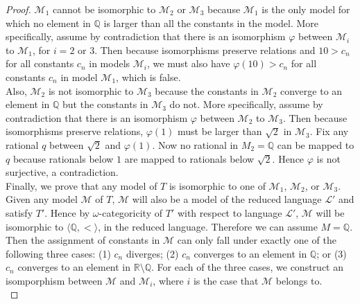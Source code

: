 \documentclass{article}
\begin{document}
\begin{enumerate}[label={\bf Q\arabic*:}]
\begin{enumerate}
\begin{proof}
          $\mathcal{M}_1$ cannot be isomorphic to $\mathcal{M}_2$ or
          $\mathcal{M}_3$ because $\mathcal{M}_1$ is the only model for
          which no element in $\mathbb{Q}$ is larger than all the constants
          in the model. More specifically, assume by contradiction that
          there is an isomorphism $\varphi$ between $\mathcal{M}_i$ to
          $\mathcal{M}_1$, for $i=2$ or $3$. Then because isomorphisms
          preserve relations and $10>c_n$ for all constants $c_n$ in models
          $\mathcal{M}_i$, we must also have $\varphi(10)>c_n$ for all
          constants $c_n$ in model $\mathcal{M}_1$, which is false. \\

          Also, $\mathcal{M}_2$ is not isomorphic to $\mathcal{M}_3$
          because the constants in $\mathcal{M}_2$ converge to an element
          in $\mathbb{Q}$ but the constants in $\mathcal{M}_3$ do not.
          More specifically, assume by contradiction that there is an
          isomorphism $\varphi$ between $\mathcal{M}_2$ to $\mathcal{M}_3$.
          Then because isomorphisms preserve relations, $\varphi(1)$ must
          be larger than $\sqrt{2}$ in $\mathcal{M}_3$. Fix any rational
          $q$ between $\sqrt{2}$ and $\varphi(1)$. Now no rational in
          $M_2=\mathbb{Q}$ can be mapped to $q$ because rationals below $1$
          are mapped to rationals below $\sqrt{2}$. Hence $\varphi$ is not
          surjective, a contradiction. \\

          Finally, we prove that any model of $T$ is isomorphic to one of
          $\mathcal{M}_1$, $\mathcal{M}_2$, or $\mathcal{M}_3$. Given any
          model $\mathcal{M}$ of $T$, $\mathcal{M}$ will also be a model of
          the reduced language $\mathcal{L}'$ and satisfy $T'$. Hence by
          $\omega$-categoricity of $T'$ with respect to language
          $\mathcal{L}'$, $\mathcal{M}$ will be isomorphic to
          $\langle\mathbb{Q},<\rangle$, in the reduced language. Therefore
          we can assume $M=\mathbb{Q}$. Then the assignment of constants in
          $\mathcal{M}$ can only fall under exactly one of the following
          three cases: (1) $c_n$ diverges; (2) $c_n$ converges to an
          element in $\mathbb{Q}$; or (3) $c_n$ converges to an element in
          $\mathbb{R}\setminus\mathbb{Q}$. For each of the three cases, we
          construct an isomporphism between $\mathcal{M}$ and
          $\mathcal{M}_i$, where $i$ is the case that $\mathcal{M}$ belongs
          to. \\


\end{proof}
\end{enumerate}
\end{enumerate}
\end{document}
